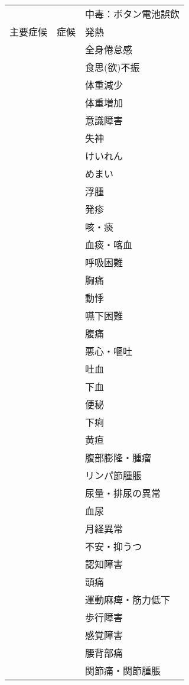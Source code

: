 \begin{xltabular}{\linewidth}{XXX}
 &  & 中毒：ボタン電池誤飲  \\
主要症候 & 症候 & 発熱 \\
 &  & 全身倦怠感 \\
 &  & 食思(欲)不振 \\
 &  & 体重減少 \\
 &  & 体重増加 \\
 &  & 意識障害 \\
 &  & 失神 \\
 &  & けいれん \\
 &  & めまい \\
 &  & 浮腫 \\
 &  & 発疹 \\
 &  & 咳・痰 \\
 &  & 血痰・喀血 \\
 &  & 呼吸困難 \\
 &  & 胸痛 \\
 &  & 動悸 \\
 &  & 嚥下困難 \\
 &  & 腹痛 \\
 &  & 悪心・嘔吐 \\
 &  & 吐血 \\
 &  & 下血 \\
 &  & 便秘 \\
 &  & 下痢 \\
 &  & 黄疸 \\
 &  & 腹部膨隆・腫瘤 \\
 &  & リンパ節腫脹 \\
 &  & 尿量・排尿の異常 \\
 &  & 血尿 \\
 &  & 月経異常 \\
 &  & 不安・抑うつ \\
 &  & 認知障害 \\
 &  & 頭痛 \\
 &  & 運動麻痺・筋力低下 \\
 &  & 歩行障害 \\
 &  & 感覚障害 \\
 &  & 腰背部痛 \\
 &  & 関節痛・関節腫脹 \\
\bottomrule
\end{xltabular}


